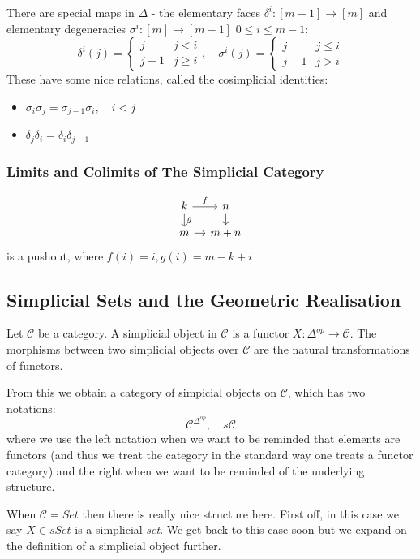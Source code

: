 There are special maps in $\Delta$ - the elementary faces $\delta^i: [m - 1]\to [m]$ and elementary degeneracies $\sigma^i: [m] \to [m-1]$ $0 \leq i \leq m - 1$:
\[\delta^i(j) = 
\begin{cases}
    j & j < i \\
    j + 1 & j \geq i
\end{cases}, \quad \sigma^i(j) = 
\begin{cases}
    j & j \leq i \\
    j - 1 & j > i
\end{cases}
\]
These have some nice relations, called the cosimplicial identities:
\begin{itemize}
    \item $\sigma_i\sigma_j = \sigma_{j-1}\sigma_i, \quad i < j$
    \item $\delta_j \delta_i =\delta_i\delta_{j-1}$
\end{itemize}

\subsubsection{Limits and Colimits of The Simplicial Category}
\[\begin{tikzcd}[column sep=1em, row sep=1em]
    k \arrow[r, "f"] \arrow[d, "g"] & n \arrow[d] \\
    m \arrow[r] & m + n
\end{tikzcd}\]
is a pushout, where $f(i) = i, g(i) = m - k + i$

\subsection{Simplicial Sets and the Geometric Realisation}
Let $\mathcal{C}$ be a category. A simplicial object in $\mathcal{C}$ is a functor $X: \Delta^{op}\to \mathcal{C}$. The morphisms between two simplicial objects over $\mathcal{C}$ are the natural transformations of functors. 

From this we obtain a category of simpicial objects on $\mathcal{C}$, which has two notations:
\[\mathcal{C}^{\Delta^{op}}, \quad s\mathcal{C}\]
where we use the left notation when we want to be reminded that elements are functors (and thus we treat the category in the standard way one treats a functor category) and the right when we want to be reminded of the underlying structure. 

When $\mathcal{C} = Set$ then there is really nice structure here. First off, in this case we say $X\in sSet$ is a simplicial \textit{set}. We get back to this case soon but we expand on the definition of a simplicial object further. 

